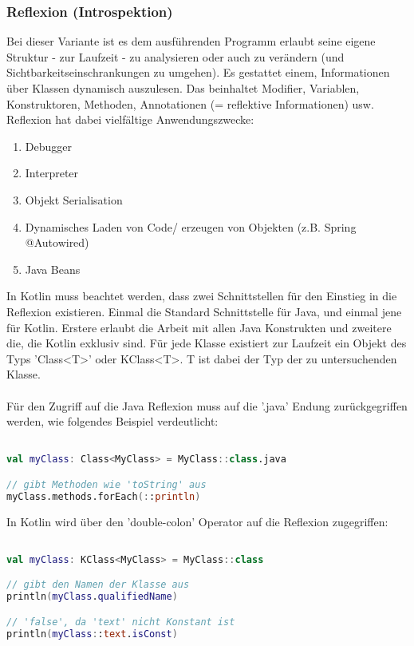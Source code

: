 \subsubsection{Reflexion (Introspektion)}
Bei dieser Variante ist es dem ausführenden Programm erlaubt seine eigene Struktur - zur Laufzeit - zu analysieren oder auch zu verändern (und Sichtbarkeitseinschrankungen zu umgehen). Es gestattet einem, Informationen über Klassen dynamisch auszulesen. Das beinhaltet Modifier, Variablen, Konstruktoren, Methoden, Annotationen (= reflektive Informationen) usw. Reflexion hat dabei vielfältige Anwendungszwecke:
\begin{enumerate}
	\item Debugger
	\item Interpreter
	\item Objekt Serialisation
	\item Dynamisches Laden von Code/ erzeugen von Objekten (z.B. Spring @Autowired)
	\item Java Beans
\end{enumerate}
\bigskip
In Kotlin muss beachtet werden, dass zwei Schnittstellen für den Einstieg in die Reflexion existieren. Einmal die Standard Schnittstelle für Java, und einmal jene für Kotlin. Erstere erlaubt die Arbeit mit allen Java Konstrukten und zweitere die, die Kotlin exklusiv sind. Für jede Klasse existiert zur Laufzeit ein Objekt des Typs 'Class<T>' oder KClass<T>. T ist dabei der Typ der zu untersuchenden Klasse.
\\
\\
Für den Zugriff auf die Java Reflexion muss auf die '.java' Endung zurückgegriffen werden, wie folgendes Beispiel verdeutlicht:
\begin{lstlisting}[caption={Java Reflexion}, label={lst:data-class}, language=Kotlin]

val myClass: Class<MyClass> = MyClass::class.java

// gibt Methoden wie 'toString' aus
myClass.methods.forEach(::println)
\end{lstlisting}
\bigskip
In Kotlin wird über den 'double-colon' Operator auf die Reflexion zugegriffen:
\begin{lstlisting}[caption={Kotlin Reflexion}, label={lst:data-class}, language=Kotlin]

val myClass: KClass<MyClass> = MyClass::class

// gibt den Namen der Klasse aus
println(myClass.qualifiedName)

// 'false', da 'text' nicht Konstant ist
println(myClass::text.isConst)
\end{lstlisting}
